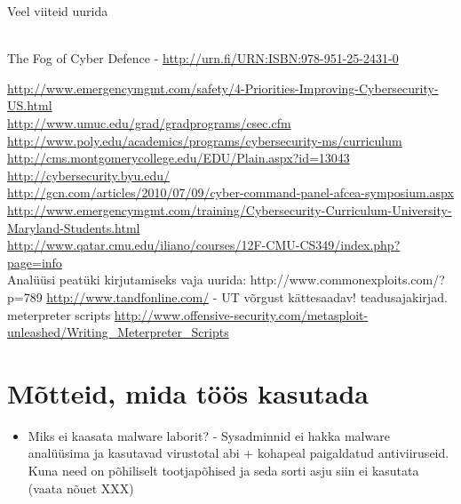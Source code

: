 Veel viiteid uurida 
{\scriptsize
\\

The Fog of Cyber Defence - \url{http://urn.fi/URN:ISBN:978-951-25-2431-0}

\url{http://www.emergencymgmt.com/safety/4-Priorities-Improving-Cybersecurity-US.html}\\
\url{http://www.umuc.edu/grad/gradprograms/csec.cfm}
\\
\url{http://www.poly.edu/academics/programs/cybersecurity-ms/curriculum}\\
\url{http://cms.montgomerycollege.edu/EDU/Plain.aspx?id=13043}\\
\url{http://cybersecurity.byu.edu/}\\
\url{http://gcn.com/articles/2010/07/09/cyber-command-panel-afcea-symposium.aspx}\\
\url{http://www.emergencymgmt.com/training/Cybersecurity-Curriculum-University-Maryland-Students.html}\\
\url{http://www.qatar.cmu.edu/iliano/courses/12F-CMU-CS349/index.php?page=info}\\
{\color{red} Analüüsi peatüki kirjutamiseks vaja uurida:}
http://www.commonexploits.com/?p=789
\url{http://www.tandfonline.com/} - UT võrgust kättesaadav! teadusajakirjad.
meterpreter scripts \url{http://www.offensive-security.com/metasploit-unleashed/Writing_Meterpreter_Scripts}
}


\section{Mõtteid, mida töös kasutada}

\begin{itemize}
\item Miks ei kaasata malware laborit? - Sysadminnid ei hakka malware analüüsima ja kasutavad virustotal abi + kohapeal paigaldatud antiviiruseid. Kuna need on põhiliselt tootjapõhised ja seda sorti asju siin ei kasutata (vaata nõuet XXX)
\end{itemize}